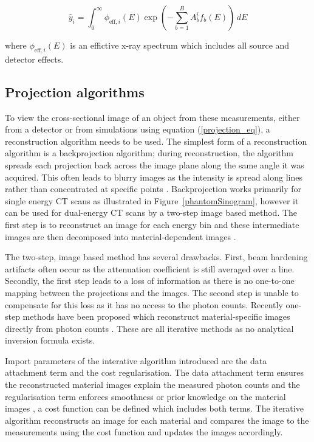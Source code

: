 \documentclass{article}
\begin{document}
\begin{equation}
\hat{y}_i = \int_0^{\infty} \phi_{\text{eff},i}(E) \exp\left( - \sum_{b=1}^{B} A_b^i f_b(E) \right) \, dE
\end{equation}

where $\phi_{\text{eff},i}(E)$ is an effictive x-ray spectrum which includes all source and detector effects.

\subsection{Projection algorithms}

To view the cross-sectional image of an object from these measurements, either from a detector or from simulations using equation (\ref{projection_eq}), a reconstruction algorithm needs to be used. The simplest form of a reconstruction algorithm is a backprojection algorithm; during reconstruction, the algorithm spreads each projection back across the image plane along the same angle it was acquired. This often leads to blurry images as the intensity is spread along lines rather than concentrated at specific points \citep{zeng2001image}. Backprojection works primarily for single energy CT scans as illustrated in Figure~\ref{phantomSinogram}, however it can be used for dual-energy CT scans by a two-step image based method. The first step is to reconstruct an image for each energy bin and these intermediate images are then decomposed into material-dependent images \citep{mory2018comparison}.

The two-step, image based method has several drawbacks. First, beam hardening artifacts often occur as the attenuation coefficient is still averaged over a line. Secondly, the first step leads to a loss of information as there is no one-to-one mapping between the projections and the images. The second step is unable to compensate for this loss as it has no access to the photon counts. Recently one-step methods have been proposed which reconstruct material-specific images directly from photon counts \citep{mechlem2018joint}. These are all iterative methods as no analytical inversion formula exists.

Import parameters of the interative algorithm introduced are the data attachment term and the cost regularisation. The data attachment term ensures the reconstructed material images explain the measured photon counts and the regularisation term enforces smoothness or prior knowledge on the material images \citep{Zhang2018Regularization}, a cost function can be defined which includes both terms. The iterative algorithm reconstructs an image for each material and compares the image to the measurements using the cost function and updates the images accordingly.
\end{document}

